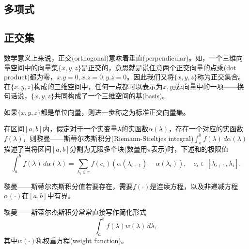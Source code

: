 \begin{subappendices}
\section{多项式}
\label{sec:poly}

\subsection{正交集}
数学意义上来说，正交(orthogonal)意味着垂直(perpendicular)。如，一个三维向量空间中的向量集$\{x,y,z\}$是正交的，意思就是说任意两个正交向量的点乘(dot product)都为零，$x.y=0,x.z=0,y.z=0$。因此我们又将$\{x,y,z\}$称为正交集合。在$\{x,y,z\}$构成的三维空间中，任何一点都可以表示为$x,y$或$z$向量中的一项——换句话说，$\{x,y,z\}$共同构成了一个三维空间的基(basis)。

如果$\{x,y,z\}$都是单位向量，则进一步称之为标准正交向量集。

\begin{definition}[黎曼——斯蒂尔杰斯积分]
  在区间$[a,b]$内，假定对于一个实变量$\lambda$的实函数$\alpha(\lambda)$，存在一个对应的实函数$f(\lambda)$，则黎曼——斯蒂尔杰斯积分(Riemann-Stieltjes integral)$\int_{a}^{b} f(\lambda) \, d \alpha(\lambda)$描述了当将区间$[a,b]$分割为无限多个块(数量用$\pi$表示)时，下述和的极限值
\begin{equation}
  \label{eq:poly-riemann-sitltjes-def}
  \int_a^b f(\lambda) \, d \alpha(\lambda) = \sum_{\lambda_i \in \pi } f(c_i) \left( \alpha(\lambda_{i+1}) - \alpha(\lambda_{i})\right), \quad c_i \in [\lambda_{i+1}, \lambda_{i}].
\end{equation}
\end{definition}
黎曼——斯蒂尔杰斯积分值若要存在，需要$f(\cdot)$是连续方程，以及非递减方程$\alpha(\cdot)$在$[a,b]$中有界。

黎曼——斯蒂尔杰斯积分常常直接写作简化形式
\begin{equation}
  \label{eq:poly-riemann-sitltjes-def-simp}
  \int_a^b f(\lambda) w(\lambda) \, d \lambda,
\end{equation}
其中$w(\cdot)$称权重方程(weight function)。


\end{subappendices}
